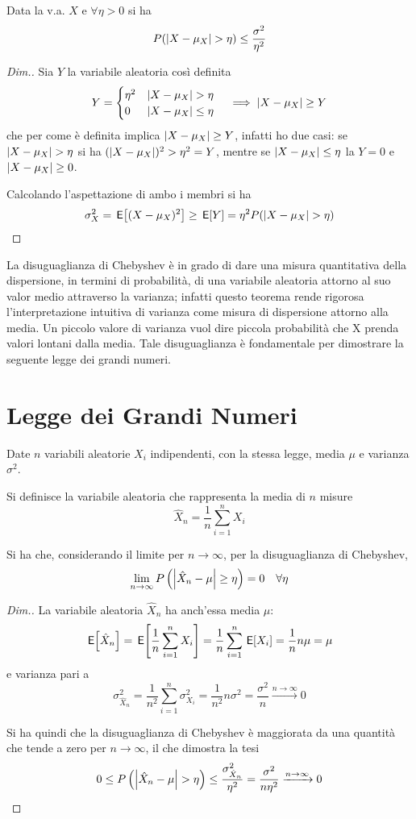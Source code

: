 Data la v.a. $X$ e $\forall\eta>0$ si ha
\begin{equation}
	P(\abs{X-\mu_X}>\eta)\leq\frac{\sigma^2}{\eta^2}
\end{equation}
\begin{proof}[Dim.]
Sia $Y$ la variabile aleatoria così definita
\[
	Y=\begin{cases}\eta^2&\abs{X-\mu_X}>\eta\\0&\abs{X-\mu_X}\leq\eta\end{cases}\quad\implies\abs{X-\mu_X}\geq Y
\]
che per come è definita implica $\left|{X-\mu_X}\right|\geq Y$, infatti ho due casi: se $\abs{X-\mu_X}>\eta$ si ha $(\left|{X-\mu_X}\right|)^2>\eta^2=Y$, mentre se $\left|{X-\mu_X}\right|\leq\eta$ la $Y=0$ e $\left|{X-\mu_X}\right|\geq 0$.

Calcolando l'aspettazione di ambo i membri si ha
\[
	\sigma^2_X=\E{(X-\mu_X)^2}\geq \E{Y}=\eta^2 P(\abs{X-\mu_X}>\eta)
\]
\end{proof}

La disuguaglianza di Chebyshev è in grado di dare una misura quantitativa della dispersione, in termini di probabilità, di una variabile aleatoria attorno al suo valor medio attraverso la varianza; infatti questo teorema rende rigorosa l'interpretazione intuitiva di varianza come misura di dispersione attorno alla media. Un piccolo valore di varianza vuol dire piccola probabilità che X prenda valori lontani dalla media.
Tale disuguaglianza è fondamentale per dimostrare la seguente legge dei grandi numeri.

\section{Legge dei Grandi Numeri}
Date $n$ variabili aleatorie $X_i$ indipendenti, con la stessa legge, media $\mu$ e varianza $\sigma^2$.

Si definisce la variabile aleatoria che rappresenta la media di $n$ misure
\[
	\hat{X}_n=\frac{1}{n}\sum_{i=1}^{n}X_i
\]

Si ha che, considerando il limite per $n\to\infty$, per la disuguaglianza di Chebyshev,
\begin{equation}
\label{eq:legge_grandi_numeri}
	\lim\limits_{n\to\infty} P\left(\left|{\hat{X}_n-\mu}\right|\geq\eta\right)=0\quad\forall\eta
\end{equation}

\begin{proof}[Dim.]
La variabile aleatoria $\hat{X}_n$ ha anch'essa media $\mu$:
\[
	\,{\operatorname{\mathsf{E}}}\!\left[{\hat{X}_n}\right]=\,{\operatorname{\mathsf{E}}}\!\left[{\frac{1}{n}\sum_{i=1}^{n}X_i}\right]=\frac{1}{n}\sum_{i=1}^{n}\,{\operatorname{\mathsf{E}}}\!\left[{X_i}\right]=\frac{1}{n}n\mu=\mu
\]
e varianza pari a
\[
	\sigma^2_{\hat{X}_n}=\frac{1}{n^2}\sum_{i=1}^{n}\sigma^2_{X_i}=\frac{1}{n^2}n\sigma^2=\frac{\sigma^2}{n}\xrightarrow{n\to\infty}0
\]

Si ha quindi che la disuguaglianza di Chebyshev è maggiorata da una quantità che tende a zero per $n\to\infty$, il che dimostra la tesi
\[
	0\leq P\left(\abs{\hat{X}_n-\mu}>\eta\right)\leq \frac{\sigma^2_{\hat{X}_n}}{\eta^2}=\frac{\sigma^2}{n\eta^2} \xrightarrow{n\to\infty}0
\]
\end{proof}

